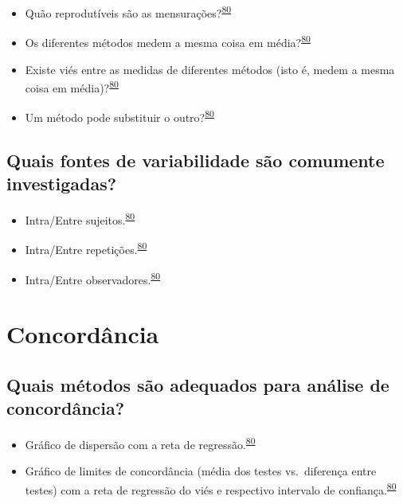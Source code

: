 \documentclass[
]{book}
\begin{document}
\begin{itemize}
\item
  Quão reprodutíveis são as mensurações?\textsuperscript{\protect\hyperlink{ref-altman1983}{80}}
\item
  Os diferentes métodos medem a mesma coisa em média?\textsuperscript{\protect\hyperlink{ref-altman1983}{80}}
\item
  Existe viés entre as medidas de diferentes métodos (isto é, medem a mesma coisa em média)?\textsuperscript{\protect\hyperlink{ref-altman1983}{80}}
\item
  Um método pode substituir o outro?\textsuperscript{\protect\hyperlink{ref-altman1983}{80}}
\end{itemize}

\hypertarget{quais-fontes-de-variabilidade-suxe3o-comumente-investigadas}{%
\subsection{Quais fontes de variabilidade são comumente investigadas?}\label{quais-fontes-de-variabilidade-suxe3o-comumente-investigadas}}

\begin{itemize}
\item
  Intra/Entre sujeitos.\textsuperscript{\protect\hyperlink{ref-altman1983}{80}}
\item
  Intra/Entre repetições.\textsuperscript{\protect\hyperlink{ref-altman1983}{80}}
\item
  Intra/Entre observadores.\textsuperscript{\protect\hyperlink{ref-altman1983}{80}}
\end{itemize}

\hypertarget{concordancia}{%
\section{Concordância}\label{concordancia}}

\hypertarget{quais-muxe9todos-suxe3o-adequados-para-anuxe1lise-de-concorduxe2ncia}{%
\subsection{Quais métodos são adequados para análise de concordância?}\label{quais-muxe9todos-suxe3o-adequados-para-anuxe1lise-de-concorduxe2ncia}}

\begin{itemize}
\item
  Gráfico de dispersão com a reta de regressão.\textsuperscript{\protect\hyperlink{ref-altman1983}{80}}
\item
  Gráfico de limites de concordância (média dos testes vs.~diferença entre testes) com a reta de regressão do viés e respectivo intervalo de confiança.\textsuperscript{\protect\hyperlink{ref-altman1983}{80}}
\end{itemize}
\end{document}
